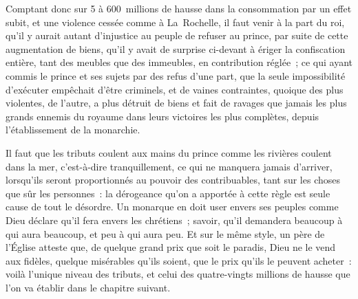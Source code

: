 \documentclass[french,twoside]{book} %
\begin{document}
Comptant donc sur 5 à 600 millions de hausse dans la consommation par un effet subit, et une violence cessée comme à La Rochelle, il faut venir à la part du roi, qu’il y aurait autant d’injustice au peuple de refuser au prince, par suite de cette augmentation de biens, qu’il y avait de surprise ci-devant à ériger la confiscation entière, tant des meubles que des immeubles, en contribution réglée ; ce qui ayant commis le prince et ses sujets par des refus d’une part, que la seule impossibilité d’exécuter empêchait d’être criminels, et de vaines contraintes, quoique des plus violentes, de l’autre, a plus détruit de biens et fait de ravages que jamais les plus grands ennemis du royaume dans leurs victoires les plus complètes, depuis l’établissement de la monarchie.\par
Il faut que les tributs coulent aux mains du prince comme les rivières coulent dans la mer, c’est-à-dire tranquillement, ce qui ne manquera jamais d’arriver, lorsqu’ils seront proportionnés au pouvoir des contribuables, tant sur les choses que sûr les personnes : la dérogeance qu’on a apportée à cette règle est seule cause de tout le désordre. Un monarque en doit user envers ses peuples comme Dieu déclare qu’il fera envers les chrétiens ; savoir, qu’il demandera beaucoup à qui aura beaucoup, et peu à qui aura peu. Et sur le même style, un père de l’Église atteste que, de quelque grand prix que soit le paradis, Dieu ne le vend aux fidèles, quelque misérables qu’ils soient, que le prix qu’ils le peuvent acheter : voilà l’unique niveau des tributs, et celui des quatre-vingts millions de hausse que l’on va établir dans le chapitre suivant.
\end{document}
